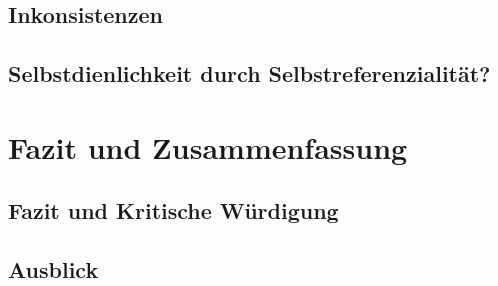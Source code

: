 \documentclass[a4paper,12pt]{article}
\begin{document}
\subsection{Inkonsistenzen}
\subsection{Selbstdienlichkeit durch Selbstreferenzialität?}
\newpage

\section{Fazit und Zusammenfassung}
\subsection{Fazit und Kritische Würdigung}
\subsection{Ausblick}


\newpage




\printbibliography
% 
% 
\end{document}
